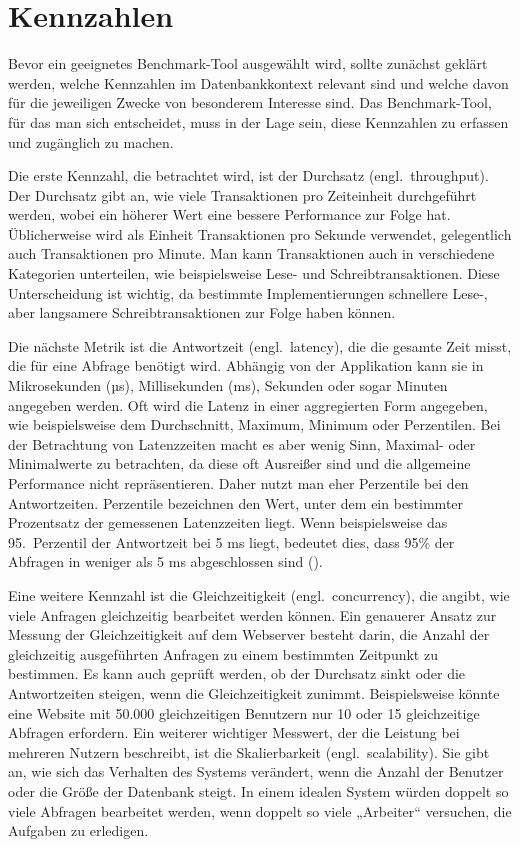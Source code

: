 \section{Kennzahlen}\label{sec:einleitung-kennzahlen}

Bevor ein geeignetes Benchmark-Tool ausgewählt wird, sollte zunächst geklärt werden, welche Kennzahlen im Datenbankkontext relevant sind und welche davon für die jeweiligen Zwecke von besonderem Interesse sind.
Das Benchmark-Tool, für das man sich entscheidet, muss in der Lage sein, diese Kennzahlen zu erfassen und zugänglich zu machen.

Die erste Kennzahl, die betrachtet wird, ist der Durchsatz (engl.\ throughput).
Der Durchsatz gibt an, wie viele Transaktionen pro Zeiteinheit durchgeführt werden, wobei ein höherer Wert eine bessere Performance zur Folge hat.
Üblicherweise wird als Einheit Transaktionen pro Sekunde verwendet, gelegentlich auch Transaktionen pro Minute.
Man kann Transaktionen auch in verschiedene Kategorien unterteilen, wie beispielsweise Lese- und Schreibtransaktionen.
Diese Unterscheidung ist wichtig, da bestimmte Implementierungen schnellere Lese-, aber langsamere Schreibtransaktionen zur Folge haben können.

Die nächste Metrik ist die Antwortzeit (engl.\ latency), die die gesamte Zeit misst, die für eine Abfrage benötigt wird.
Abhängig von der Applikation kann sie in Mikrosekunden (µs), Millisekunden (ms), Sekunden oder sogar Minuten angegeben werden.
Oft wird die Latenz in einer aggregierten Form angegeben, wie beispielsweise dem Durchschnitt, Maximum, Minimum oder Perzentilen.
Bei der Betrachtung von Latenzzeiten macht es aber wenig Sinn, Maximal- oder Minimalwerte zu betrachten, da diese oft Ausreißer sind und die allgemeine Performance nicht repräsentieren.
Daher nutzt man eher Perzentile bei den Antwortzeiten.
Perzentile bezeichnen den Wert, unter dem ein bestimmter Prozentsatz der gemessenen Latenzzeiten liegt.
Wenn beispielsweise das 95.\ Perzentil der Antwortzeit bei 5 ms liegt, bedeutet dies, dass 95\% der Abfragen in weniger als 5 ms abgeschlossen sind (\cite{perzentil_erklaerung}).

Eine weitere Kennzahl ist die Gleichzeitigkeit (engl.\ concurrency), die angibt, wie viele Anfragen gleichzeitig bearbeitet werden können.
Ein genauerer Ansatz zur Messung der Gleichzeitigkeit auf dem Webserver besteht darin, die Anzahl der gleichzeitig ausgeführten Anfragen zu einem bestimmten Zeitpunkt zu bestimmen.
Es kann auch geprüft werden, ob der Durchsatz sinkt oder die Antwortzeiten steigen, wenn die Gleichzeitigkeit zunimmt.
Beispielsweise könnte eine Website mit 50.000 gleichzeitigen Benutzern nur 10 oder 15 gleichzeitige Abfragen erfordern.
Ein weiterer wichtiger Messwert, der die Leistung bei mehreren Nutzern beschreibt, ist die Skalierbarkeit (engl.\ scalability).
Sie gibt an, wie sich das Verhalten des Systems verändert, wenn die Anzahl der Benutzer oder die Größe der Datenbank steigt.
In einem idealen System würden doppelt so viele Abfragen bearbeitet werden, wenn doppelt so viele „Arbeiter“ versuchen, die Aufgaben zu erledigen.

